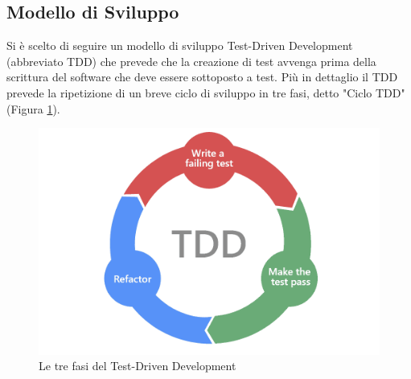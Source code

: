 \subsection{Modello di Sviluppo}
Si è scelto di seguire un modello di sviluppo Test-Driven Development (abbreviato TDD) che prevede che la creazione di test avvenga prima della scrittura del software che deve essere sottoposto a test. Più in dettaglio il TDD prevede la ripetizione di un breve ciclo di sviluppo in tre fasi, detto "Ciclo TDD" (Figura \ref{fig:tdd}). 
\begin{figure}[h]
    \centering
    \includegraphics[scale=.35]{immagini/tdd.png}
    \caption{Le tre fasi del Test-Driven Development}
    \label{fig:tdd}
\end{figure}
